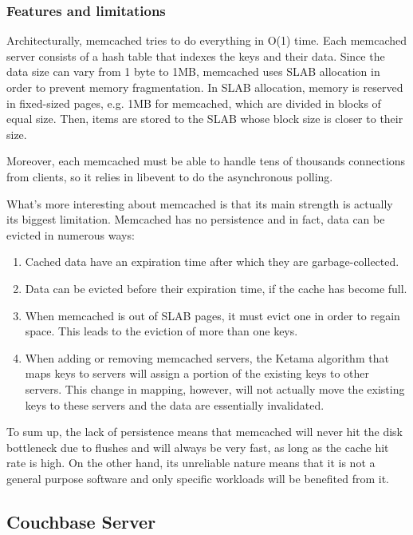\subsubsection{Features and limitations}

Architecturally, memcached tries to do everything in O(1) time. Each memcached 
server consists of a hash table that indexes the keys and their data. Since the 
data size can vary from 1 byte to 1MB, memcached uses SLAB allocation in order 
to prevent memory fragmentation. In SLAB allocation, memory is reserved in 
fixed-sized pages, e.g. 1MB for memcached, which are divided in blocks of equal 
size. Then, items are stored to the SLAB whose block size is closer to their 
size.

Moreover, each memcached must be able to handle tens of thousands connections 
from clients, so it relies in libevent to do the asynchronous polling.

What's more interesting about memcached is that its main strength is actually 
its biggest limitation. Memcached has no persistence and in fact, data can be 
evicted in numerous ways:

\begin{enumerate}
	\item Cached data have an expiration time after which they are 
		garbage-collected.
	\item Data can be evicted before their expiration time, if the cache 
		has become full.
	\item When memcached is out of SLAB pages, it must evict one in order 
		to regain space. This leads to the eviction of more than one 
		keys.
	\item When adding or removing memcached servers, the Ketama algorithm 
		that maps keys to servers will assign a portion of the existing 
		keys to other servers. This change in mapping, however, will 
		not actually move the existing keys to these servers and the 
		data are essentially invalidated.
\end{enumerate}

To sum up, the lack of persistence means that memcached will never hit the disk 
bottleneck due to flushes and will always be very fast, as long as the cache 
hit rate is high. On the other hand, its unreliable nature means that it is not 
a general purpose software and only specific workloads will be benefited from 
it.

\subsection{Couchbase Server}

